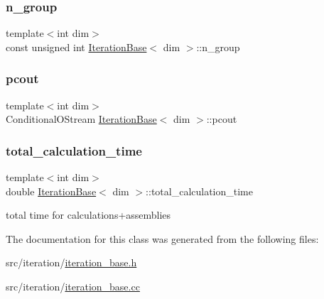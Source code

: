 \subsubsection{\texorpdfstring{n\+\_\+group}{n\_group}}
{\footnotesize\ttfamily template$<$int dim$>$ \\
const unsigned int \hyperlink{class_iteration_base}{Iteration\+Base}$<$ dim $>$\+::n\+\_\+group\hspace{0.3cm}{\ttfamily [protected]}}

\mbox{\label{class_iteration_base_ab057491553962560cfad06f19fb00ff5}} 
\subsubsection{\texorpdfstring{pcout}{pcout}}
{\footnotesize\ttfamily template$<$int dim$>$ \\
Conditional\+O\+Stream \hyperlink{class_iteration_base}{Iteration\+Base}$<$ dim $>$\+::pcout\hspace{0.3cm}{\ttfamily [protected]}}

\mbox{\label{class_iteration_base_a98cf351c6b85b6bbdc68c914ecdaaf1e}} 
\subsubsection{\texorpdfstring{total\+\_\+calculation\+\_\+time}{total\_calculation\_time}}
{\footnotesize\ttfamily template$<$int dim$>$ \\
double \hyperlink{class_iteration_base}{Iteration\+Base}$<$ dim $>$\+::total\+\_\+calculation\+\_\+time\hspace{0.3cm}{\ttfamily [protected]}}

total time for calculations+assemblies 

The documentation for this class was generated from the following files\+:\begin{DoxyCompactItemize}
\item 
src/iteration/\hyperlink{iteration__base_8h}{iteration\+\_\+base.\+h}\item 
src/iteration/\hyperlink{iteration__base_8cc}{iteration\+\_\+base.\+cc}\end{DoxyCompactItemize}
